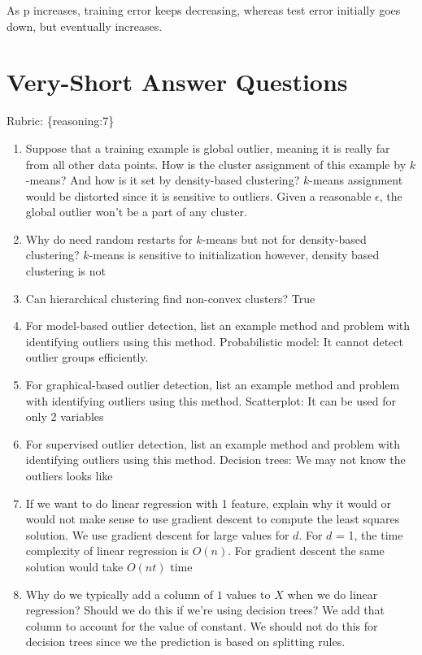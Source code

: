 \documentclass{article}
\def\rubric#1{\gre{Rubric: \{#1\}}}{}
\def\gre#1{{\color{gre}#1}}
\def\red#1{{\color{red}#1}}
\begin{document}
\red{As p increases, training error keeps decreasing, whereas test error initially goes down, but eventually increases.}


\section{Very-Short Answer Questions}
\rubric{reasoning:7}

\begin{enumerate}
\item Suppose that a training example is global outlier, meaning it is really far from all other data points. How is the cluster assignment of this example by $k$-means? And how is it set by density-based clustering? \red{$k$-means assignment would be distorted since it is sensitive to outliers. Given a reasonable $\epsilon$, the global outlier won't be a part of any cluster.}
\item Why do need random restarts for $k$-means but not for density-based clustering? \red{$k$-means is sensitive to initialization however, density based clustering is not}
\item Can hierarchical clustering find non-convex clusters? \red{True}
\item For model-based outlier detection, list an example method and problem with identifying outliers using this method. \red{Probabilistic model:} \gre{It cannot detect outlier groups efficiently.}
\item For graphical-based outlier detection, list an example method and problem with identifying outliers using this method. \red{Scatterplot:} \gre{It can be used for only 2 variables}
\item For supervised outlier detection, list an example method and problem with identifying outliers using this method. \red{Decision trees:} \gre{We may not know the outliers looks like}
\item If we want to do linear regression with 1 feature, explain why it would or would not make sense to use gradient descent to compute the least squares solution. \red{We use gradient descent for large values for $d$. For $d$ = 1, the time complexity of linear regression is $O(n)$. For gradient descent the same solution would take $O(nt)$ time}
\item Why do we typically add a column of $1$ values to $X$ when we do linear regression? Should we do this if we're using decision trees? \red{We add that column to account for the value of constant. We should not do this for decision trees since we the prediction is based on splitting rules.}

\end{enumerate}
\end{document}
